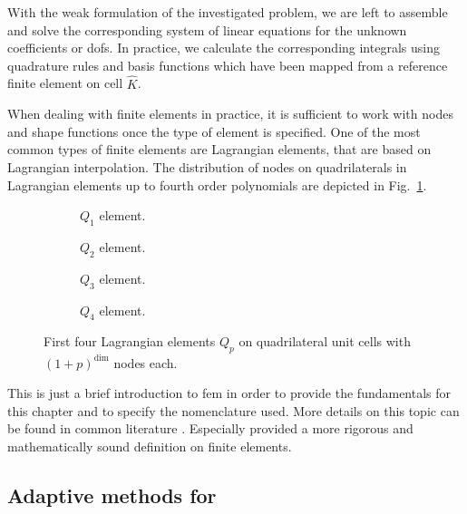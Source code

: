 With the weak formulation of the investigated problem, we are left to assemble and solve the corresponding system of linear equations for the unknown coefficients or \glspl{dof}. In practice, we calculate the corresponding integrals using quadrature rules and basis functions which have been mapped from a reference finite element on cell $\widehat{K}$.

When dealing with finite elements in practice, it is sufficient to work with nodes and shape functions once the type of element is specified. One of the most common types of finite elements are Lagrangian elements, that are based on Lagrangian interpolation. The distribution of nodes on quadrilaterals in Lagrangian elements up to fourth order polynomials are depicted in Fig.~\ref{fig:lagrange}.

\begin{figure}
\begin{subfigure}{.24\textwidth}
  \centering
  
  \caption{$Q_1$ element.}
\end{subfigure}
\begin{subfigure}{.24\textwidth}
  \centering
  
  \caption{$Q_2$ element.}
\end{subfigure}
\begin{subfigure}{.24\textwidth}
  \centering
  
  \caption{$Q_3$ element.}
\end{subfigure}
\begin{subfigure}{.24\textwidth}
  \centering
  
  \caption{$Q_4$ element.}
\end{subfigure}
\caption[Lagrangian elements $Q_p$.]{First four Lagrangian elements $Q_p$ on quadrilateral unit cells with $(1+p)^\text{dim}$ nodes each.}
\label{fig:lagrange}
\end{figure}

This is just a brief introduction to \gls{fem} in order to provide the fundamentals for this chapter and to specify the nomenclature used. More details on this topic can be found in common literature \parencite[e.g.][]{quarteroni1994, ern2004, elman2014}. Especially \textcite{brenner2008} provided a more rigorous and mathematically sound definition on finite elements.


\subsection{Adaptive methods for }

